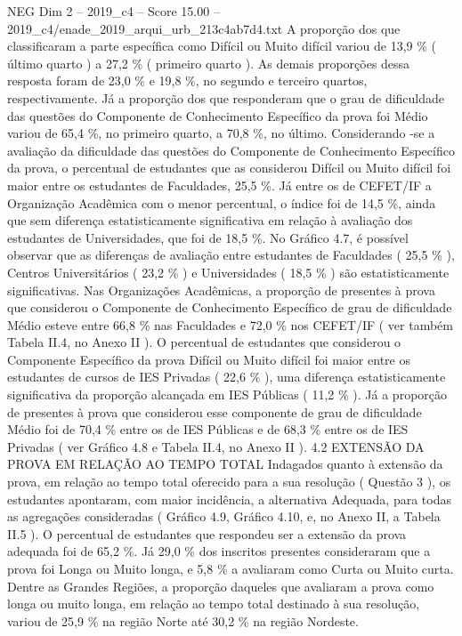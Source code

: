 \begin{textsample}{NEG Dim 2 – 2019\_c4 – Score 15.00 – 2019\_c4/enade\_2019\_arqui\_urb\_213c4ab7d4.txt}
A proporção dos que classificaram a parte específica como Difícil ou Muito difícil variou de 13,9 \% ( último quarto ) a 27,2 \% ( primeiro quarto ).
As demais proporções dessa resposta foram de 23,0 \% e 19,8 \%, no segundo e terceiro quartos, respectivamente.
Já a proporção dos que responderam que o grau de dificuldade das questões do Componente de Conhecimento Específico da prova foi Médio variou de 65,4 \%, no primeiro quarto, a 70,8 \%, no último.
Considerando -se a avaliação da dificuldade das questões do Componente de Conhecimento Específico da prova, o percentual de estudantes que as considerou Difícil ou Muito difícil foi maior entre os estudantes de Faculdades, 25,5 \%.
Já entre os de CEFET/IF a Organização Acadêmica com o menor percentual, o índice foi de 14,5 \%, ainda que sem diferença estatisticamente significativa em relação à avaliação dos estudantes de Universidades, que foi de 18,5 \%.
No Gráfico 4.7, é possível observar que as diferenças de avaliação entre estudantes de Faculdades ( 25,5 \% ), Centros Universitários ( 23,2 \% ) e Universidades ( 18,5 \% ) são estatisticamente significativas.
Nas Organizações Acadêmicas, a proporção de presentes à prova que considerou o Componente de Conhecimento Específico de grau de dificuldade Médio esteve entre 66,8 \% nas Faculdades e 72,0 \% nos CEFET/IF ( ver também Tabela II.4, no Anexo II ).
O percentual de estudantes que considerou o Componente Específico da prova Difícil ou Muito difícil foi maior entre os estudantes de cursos de IES Privadas ( 22,6 \% ), uma diferença estatisticamente significativa da proporção alcançada em IES Públicas ( 11,2 \% ).
Já a proporção de presentes à prova que considerou esse componente de grau de dificuldade Médio foi de 70,4 \% entre os de IES Públicas e de 68,3 \% entre os de IES Privadas ( ver Gráfico 4.8 e Tabela II.4, no Anexo II ). 4.2 EXTENSÃO DA PROVA EM RELAÇÃO AO TEMPO TOTAL Indagados quanto à extensão da prova, em relação ao tempo total oferecido para a sua resolução ( Questão 3 ), os estudantes apontaram, com maior incidência, a alternativa Adequada, para todas as agregações consideradas ( Gráfico 4.9, Gráfico 4.10, e, no Anexo II, a Tabela II.5 ).
O percentual de estudantes que respondeu ser a extensão da prova adequada foi de 65,2 \%.
Já 29,0 \% dos inscritos presentes consideraram que a prova foi Longa ou Muito longa, e 5,8 \% a avaliaram como Curta ou Muito curta.
Dentre as Grandes Regiões, a proporção daqueles que avaliaram a prova como longa ou muito longa, em relação ao tempo total destinado à sua resolução, variou de 25,9 \% na região Norte até 30,2 \% na região Nordeste.

\end{textsample}
